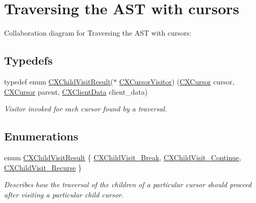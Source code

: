 \hypertarget{group__CINDEX__CURSOR__TRAVERSAL}{}\section{Traversing the A\+ST with cursors}
\label{group__CINDEX__CURSOR__TRAVERSAL}
Collaboration diagram for Traversing the A\+ST with cursors\+:
\subsection*{Typedefs}
\begin{DoxyCompactItemize}
\item 
typedef enum \hyperlink{group__CINDEX__CURSOR__TRAVERSAL_ga99a9058656e696b622fbefaf5207d715}{C\+X\+Child\+Visit\+Result}($\ast$ \hyperlink{group__CINDEX__CURSOR__TRAVERSAL_gabf842c9ee20048b596eb9dfe94bb1570}{C\+X\+Cursor\+Visitor}) (\hyperlink{structCXCursor}{C\+X\+Cursor} cursor, \hyperlink{structCXCursor}{C\+X\+Cursor} parent, \hyperlink{group__CINDEX_gacfa40c3de26d228c0d898403c2c21612}{C\+X\+Client\+Data} client\+\_\+data)
\begin{DoxyCompactList}\small\item\em Visitor invoked for each cursor found by a traversal. \end{DoxyCompactList}\end{DoxyCompactItemize}
\subsection*{Enumerations}
\begin{DoxyCompactItemize}
\item 
enum \hyperlink{group__CINDEX__CURSOR__TRAVERSAL_ga99a9058656e696b622fbefaf5207d715}{C\+X\+Child\+Visit\+Result} \{ \hyperlink{group__CINDEX__CURSOR__TRAVERSAL_gga99a9058656e696b622fbefaf5207d715a0c5350aa7e393b623b93338d0c6c037b}{C\+X\+Child\+Visit\+\_\+\+Break}, 
\hyperlink{group__CINDEX__CURSOR__TRAVERSAL_gga99a9058656e696b622fbefaf5207d715a80e20ce8a41365f0a73c6dd3177488da}{C\+X\+Child\+Visit\+\_\+\+Continue}, 
\hyperlink{group__CINDEX__CURSOR__TRAVERSAL_gga99a9058656e696b622fbefaf5207d715a61a23204a2aa9670ceabb7b2b17c5100}{C\+X\+Child\+Visit\+\_\+\+Recurse}
 \}\begin{DoxyCompactList}\small\item\em Describes how the traversal of the children of a particular cursor should proceed after visiting a particular child cursor. \end{DoxyCompactList}
\end{DoxyCompactItemize}
